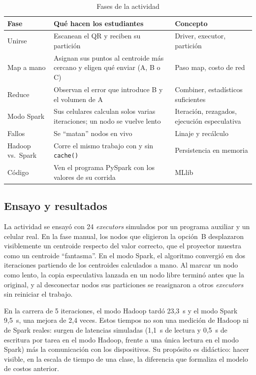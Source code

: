 \documentclass[conference,a4paper]{IEEEtran}
\begin{document}
\begin{table}[t]
\caption{Fases de la actividad}
\label{tab:fases}
\centering
\begin{tabular}{@{}>{\raggedright\arraybackslash}p{1.6cm}>{\raggedright\arraybackslash}p{3.3cm}>{\raggedright\arraybackslash}p{2.3cm}@{}}
\toprule
\textbf{Fase} & \textbf{Qué hacen los estudiantes} & \textbf{Concepto} \\
\midrule
Unirse & Escanean el QR y reciben su partición & Driver, executor, partición \\
Map a mano & Asignan sus puntos al centroide más cercano y eligen qué enviar (A, B o C) & Paso map, costo de red \\
Reduce & Observan el error que introduce B y el volumen de A & Combiner, estadísticos suficientes \\
Modo Spark & Sus celulares calculan solos varias iteraciones; un nodo se vuelve lento & Iteración, rezagados, ejecución especulativa \\
Fallos & Se ``matan'' nodos en vivo & Linaje y recálculo \\
Hadoop vs.\ Spark & Corre el mismo trabajo con y sin \texttt{cache()} & Persistencia en memoria \\
Código & Ven el programa PySpark con los valores de su corrida & MLlib \\
\bottomrule
\end{tabular}
\end{table}

\subsection{Ensayo y resultados}

La actividad se ensayó con 24 \textit{executors} simulados por un programa auxiliar y un celular real. En la fase manual, los nodos que eligieron la opción~B desplazaron visiblemente un centroide respecto del valor correcto, que el proyector muestra como un centroide ``fantasma''. En el modo Spark, el algoritmo convergió en dos iteraciones partiendo de los centroides calculados a mano. Al marcar un nodo como lento, la copia especulativa lanzada en un nodo libre terminó antes que la original, y al desconectar nodos sus particiones se reasignaron a otros \textit{executors} sin reiniciar el trabajo.

En la carrera de 5 iteraciones, el modo Hadoop tardó 23,3~s y el modo Spark 9,5~s, una mejora de 2,4 veces. Estos tiempos no son una medición de Hadoop ni de Spark reales: surgen de latencias simuladas (1,1~s de lectura y 0,5~s de escritura por tarea en el modo Hadoop, frente a una única lectura en el modo Spark) más la comunicación con los dispositivos. Su propósito es didáctico: hacer visible, en la escala de tiempo de una clase, la diferencia que formaliza el modelo de costos anterior.
\end{document}
